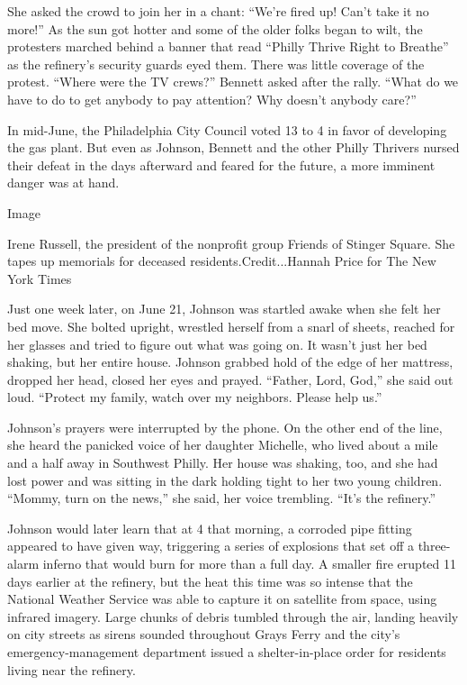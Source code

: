 She asked the crowd to join her in a chant: ``We're fired up! Can't take
it no more!'' As the sun got hotter and some of the older folks began to
wilt, the protesters marched behind a banner that read ``Philly Thrive
Right to Breathe'' as the refinery's security guards eyed them. There
was little coverage of the protest. ``Where were the TV crews?'' Bennett
asked after the rally. ``What do we have to do to get anybody to pay
attention? Why doesn't anybody care?''

In mid-June, the Philadelphia City Council voted 13 to 4 in favor of
developing the gas plant. But even as Johnson, Bennett and the other
Philly Thrivers nursed their defeat in the days afterward and feared for
the future, a more imminent danger was at hand.

Image

Irene Russell, the president of the nonprofit group Friends of Stinger
Square. She tapes up memorials for deceased residents.Credit...Hannah
Price for The New York Times

Just one week later, on June 21, Johnson was startled awake when she
felt her bed move. She bolted upright, wrestled herself from a snarl of
sheets, reached for her glasses and tried to figure out what was going
on. It wasn't just her bed shaking, but her entire house. Johnson
grabbed hold of the edge of her mattress, dropped her head, closed her
eyes and prayed. ``Father, Lord, God,'' she said out loud. ``Protect my
family, watch over my neighbors. Please help us.''

Johnson's prayers were interrupted by the phone. On the other end of the
line, she heard the panicked voice of her daughter Michelle, who lived
about a mile and a half away in Southwest Philly. Her house was shaking,
too, and she had lost power and was sitting in the dark holding tight to
her two young children. ``Mommy, turn on the news,'' she said, her voice
trembling. ``It's the refinery.''

Johnson would later learn that at 4 that morning, a corroded pipe
fitting appeared to have given way, triggering a series of explosions
that set off a three-alarm inferno that would burn for more than a full
day. A smaller fire erupted 11 days earlier at the refinery, but the
heat this time was so intense that the National Weather Service was able
to capture it on satellite from space, using infrared imagery. Large
chunks of debris tumbled through the air, landing heavily on city
streets as sirens sounded throughout Grays Ferry and the city's
emergency-management department issued a shelter-in-place order for
residents living near the refinery.

